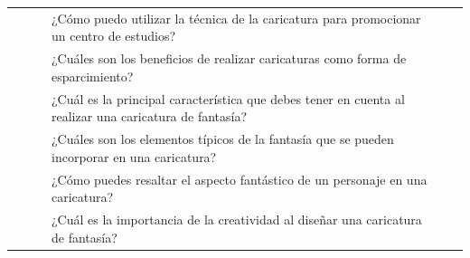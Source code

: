 \documentclass[12pt,a4paper]{article}
\begin{document}
\begin{landscape}
\begin{table}[ht!]
\begin{tabular}{clllcc}
			                                                       &                           & \multirow{1}{*}{\gbbb}              & ¿Cómo puedo utilizar la técnica de la caricatura para promocionar un centro de estudios?               &                                                                                                                                                        \\\cline{3-4}
			                                                       &                           & \multirow{1}{*}{\gbbbb}             & ¿Cuáles son los beneficios de realizar caricaturas como forma de esparcimiento?                        &                                                                                                                                                        \\\cline{2-4}
			                                                       & \multirow{6}{*}{\dimii}   & \multirow{2}{*}{\gbbbbb}            & ¿Cuál es la principal característica que debes tener en cuenta al realizar una caricatura de fantasía? &                                                                                                                                                        \\\cline{4-4}
			                                                       &                           &                                     & ¿Cuáles son los elementos típicos de la fantasía que se pueden incorporar en una caricatura?           &                                                                                                                                                        \\\cline{3-4}
			                                                       &                           & \multirow{1}{*}{\gbbbbbb}           & ¿Cómo puedes resaltar el aspecto fantástico de un personaje en una caricatura?                         &                                                                                                                                                        \\\cline{3-4}
			                                                       &                           & \multirow{1}{*}{\gbbbbbbb}          & ¿Cuál es la importancia de la creatividad al diseñar una caricatura de fantasía?                       &                                                                                                                                                        \\\cline{3-4}

\end{tabular}
\end{table}
\end{landscape}
\end{document}
